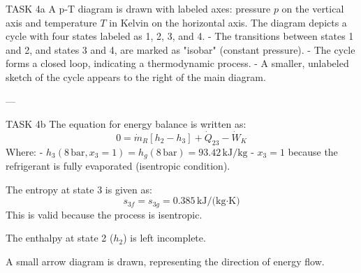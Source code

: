 TASK 4a  
A p-T diagram is drawn with labeled axes: pressure \( p \) on the vertical axis and temperature \( T \) in Kelvin on the horizontal axis. The diagram depicts a cycle with four states labeled as 1, 2, 3, and 4.  
- The transitions between states 1 and 2, and states 3 and 4, are marked as "isobar" (constant pressure).  
- The cycle forms a closed loop, indicating a thermodynamic process.  
- A smaller, unlabeled sketch of the cycle appears to the right of the main diagram.

---

TASK 4b  
The equation for energy balance is written as:  
\[
0 = \dot{m}_R \left[ h_2 - h_3 \right] + \dot{Q}_{23} - \dot{W}_K
\]  
Where:  
- \( h_3(8 \, \text{bar}, x_3 = 1) = h_g(8 \, \text{bar}) = 93.42 \, \text{kJ/kg} \)  
- \( x_3 = 1 \) because the refrigerant is fully evaporated (isentropic condition).  

The entropy at state 3 is given as:  
\[
s_{3f} = s_{3g} = 0.385 \, \text{kJ/(kg·K)}
\]  
This is valid because the process is isentropic.  

The enthalpy at state 2 (\( h_2 \)) is left incomplete.  

A small arrow diagram is drawn, representing the direction of energy flow.